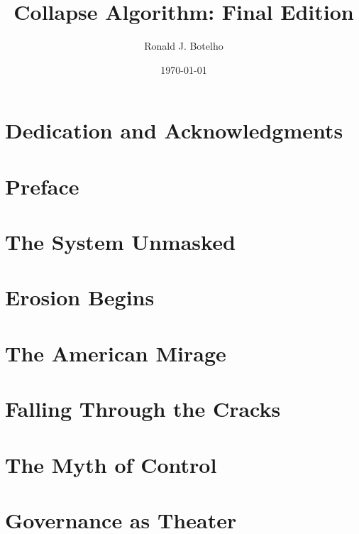 \documentclass[12pt]{book}
\title{\Huge Collapse Algorithm: Final Edition}
\author{\Large Ronald J. Botelho}
\date{\today}
\begin{document}
\frontmatter
\maketitle
\tableofcontents
\newpage


\chapter*{Dedication and Acknowledgments}


\chapter*{Preface}


\mainmatter


\chapter{The System Unmasked}


\chapter{Erosion Begins}


\chapter{The American Mirage}


\chapter{Falling Through the Cracks}


\chapter{The Myth of Control}


\chapter{Governance as Theater}

\end{document}

